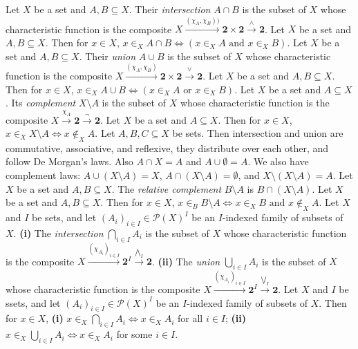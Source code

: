  Let $X$ be a set and $A, B \subseteq X$. Their \textit{intersection} $A \cap B$ is the subset of $X$ whose characteristic function is the composite $X \xrightarrow{(\chi_A, \chi_B))} \mathbf{2} \times \mathbf{2} \xrightarrow{\wedge} \mathbf{2}$.
 Let $X$ be a set and $A, B \subseteq X$. Then for $x \in X$, $x \in_X A \cap B \iff (x \in_X A \text{ and } x \in_X B)$.
 Let $X$ be a set and $A, B \subseteq X$. Their \textit{union} $A \cup B$ is the subset of $X$ whose characteristic function is the composite $X \xrightarrow{(\chi_A, \chi_B)} \mathbf{2} \times \mathbf{2} \xrightarrow{\vee} \mathbf{2}$.
 Let $X$ be a set and $A, B \subseteq X$. Then for $x \in X$, $x \in_X A \cup B \iff (x \in_X A \text{ or } x \in_X B)$.
 Let $X$ be a set and $A \subseteq X$. Its \textit{complement} $X \setminus A$ is the subset of $X$ whose characteristic function is the composite $X \xrightarrow{\chi_A} \mathbf{2} \xrightarrow{\neg} \mathbf{2}$.
 Let $X$ be a set and $A \subseteq X$. Then for $x \in X$, $x \in_X X \setminus A \iff x \not \in_X A$.
 Let $A, B, C \subseteq X$ be sets. Then intersection and union are commutative, associative, and reflexive, they distribute over each other, and follow De Morgan's laws. Also $A \cap X = A$ and $A \cup \emptyset = A$. We also have complement laws: $A \cup (X \setminus A) = X$, $A \cap (X \setminus A) = \emptyset$, and $X \setminus (X \setminus A) = A$.
 Let $X$ be a set and $A, B \subseteq X$. The \textit{relative complement} $B \setminus A$ is $B \cap (X \setminus A)$.
 Let $X$ be a set and $A, B \subseteq X$. Then for $x \in X$, $x \in_B B \setminus A \iff x \in_X B \text{ and } x \not \in_X A$.
 Let $X$ and $I$ be sets, and let $(A_i)_{i \in I} \in \mathscr{P}(X)^I$ be an $I$-indexed family of subsets of $X$. \textbf{(i)} The \textit{intersection} $\bigcap_{i \in I} A_i$ is the subset of $X$ whose characteristic function is the composite $X \xrightarrow{(\chi_{A_i})_{i \in I}} \mathbf{2}^I \xrightarrow{\bigwedge_I} \mathbf{2}$. \textbf{(ii)} The \textit{union} $\bigcup_{i \in I} A_i$ is the subset of $X$ whose characteristic function is the composite $X \xrightarrow{(\chi_{A_i})_{i \in I}} \mathbf{2}^I \xrightarrow{\bigvee_I} \mathbf{2}$.
 Let $X$ and $I$ be ssets, and let $(A_i)_{i \in I} \in \mathscr{P}(X)^I$ be an $I$-indexed family of subsets of $X$. Then for $x \in X$, \textbf{(i)} $x \in_X \bigcap_{i \in I} A_i \iff x \in_X A_i$ for all $i \in I$; \textbf{(ii)} $x \in_X \bigcup_{i \in I} A_i \iff x \in_X A_i$ for some $i \in I$.
